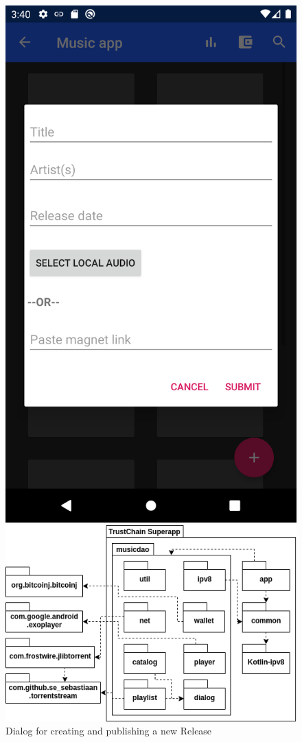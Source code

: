 \begin{figure}
        \includegraphics[width=\linewidth]{implementation/screenshot-select-tracks.png}
        \caption{Dialog for creating and publishing a new Release}
        \label{fig:submit-release-dialog}
    \endminipage\hfill
    \includegraphics[width=1\linewidth]{implementation/package-diagram.png}

\end{figure}
